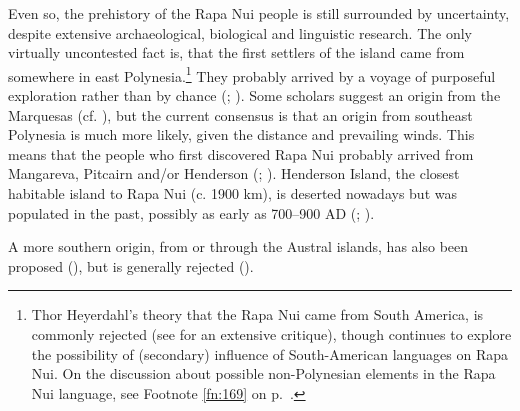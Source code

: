 Even so, the prehistory of the Rapa Nui people is still surrounded by uncertainty, despite extensive archaeological, biological and linguistic research. The only virtually uncontested fact is, that the first settlers of the island came from somewhere in east Polynesia.\footnote{\label{fn:5}Thor Heyerdahl’s theory that the Rapa Nui came from South America, is commonly rejected (see \citealt{BahnFlenley1992} for an extensive critique), though \citet{Schuhmacher1990} continues to explore the possibility of (secondary) influence of South-American languages on Rapa Nui. On the discussion about possible non-Polynesian elements in the Rapa Nui language, see Footnote \ref{fn:169} on p.~\pageref{fn:169}.} They probably arrived by a voyage of purposeful exploration rather than by chance (\citealt[72–79]{BahnFlenley1992}; \citealt[199]{KirchKahn2007}). Some scholars suggest an origin from the Marquesas (cf. \citealt[66]{BahnFlenley1992}), but the current consensus is that an origin from southeast Polynesia is much more likely, given the distance and prevailing winds. This means that the people who first discovered Rapa Nui probably arrived from Mangareva, Pitcairn and/or Henderson (\citealt{Green1998}; \citealt{StefanCollinsCuny2002}). Henderson Island, the closest habitable island to Rapa Nui (c. 1900 km), is deserted nowadays but was populated in the past, possibly as early as 700–900 AD (\citealt{Weisler1998}; \citealt{GreenWeisler2002}).

A more southern origin, from or through the Austral islands, has also been proposed (\citealt{LangdonTryon1983}), but is generally rejected (\citealt{Green1985,Green1998}).

